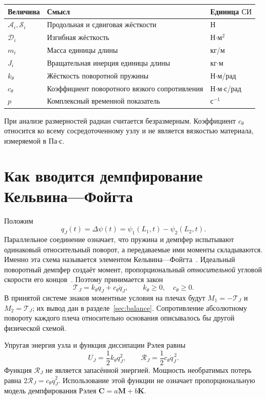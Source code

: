 \documentclass[11pt,a4paper]{article}
\numberwithin{equation}{section}
\newcommand{\A}{\mathcal A}
\newcommand{\D}{\mathcal D}
\newcommand{\Sbeam}{\mathcal S}
\newcommand{\kth}{k_\theta}
\newcommand{\cth}{c_\theta}
\newcommand{\qJ}{q_J}
\newcommand{\TJ}{\mathcal T_J}
\begin{document}
\begin{center}
\begin{tabularx}{\linewidth}{@{}lXl@{}}
\toprule
Величина & Смысл & Единица \(\text{СИ}\)\\
\midrule
$\A_i,\Sbeam_i$ & Продольная и сдвиговая жёсткости & Н\\
$\D_i$ & Изгибная жёсткость & Н$\cdot$м$^2$\\
$m_i$ & Масса единицы длины & кг/м\\
$J_i$ & Вращательная инерция единицы длины & кг$\cdot$м\\
$\kth$ & Жёсткость поворотной пружины & Н$\cdot$м/рад\\
$\cth$ & Коэффициент поворотного вязкого сопротивления & Н$\cdot$м$\cdot$с/рад\\
$p$ & Комплексный временной показатель & с$^{-1}$\\
\bottomrule
\end{tabularx}
\end{center}
При анализе размерностей радиан считается безразмерным. Коэффициент
$\cth$ относится ко всему сосредоточенному узлу и не является вязкостью
материала, измеряемой в Па$\cdot$с.

\section{Как вводится демпфирование Кельвина—Фойгта}
\label{sec:kv}

Положим
\begin{equation}
 \qJ(t)=\Delta\psi(t)=\psi_1(L_1,t)-\psi_2(L_2,t).
 \label{eq:qj}
\end{equation}
Параллельное соединение означает, что пружина и демпфер испытывают
одинаковый относительный поворот, а передаваемые ими моменты складываются.
Именно эта схема называется элементом Кельвина—Фойгта~\cite{comsolkv}.
Идеальный поворотный демпфер создаёт момент, пропорциональный
\emph{относительной} угловой скорости его концов~\cite{mathworksdamper}.
Поэтому принимается закон
\begin{equation}
 \boxed{\TJ=\kth\qJ+\cth\dot\qJ,\qquad \kth\ge0,\quad \cth\ge0.}
 \label{eq:kv}
\end{equation}
В принятой системе знаков моментные условия на плечах будут
$M_1=-\TJ$ и $M_2=\TJ$; их вывод дан в разделе~\ref{sec:balance}.
Сопротивление абсолютному повороту каждого плеча относительно основания
описывалось бы другой физической схемой.

Упругая энергия узла и функция диссипации Рэлея равны
\begin{equation}
 U_J=\frac12\kth\qJ^2,
 \qquad
 \mathcal R_J=\frac12\cth\dot\qJ^{\,2}.
 \label{eq:UR}
\end{equation}
Функция $\mathcal R_J$ не является запасённой энергией. Мощность
необратимых потерь равна $2\mathcal R_J=\cth\dot\qJ^2$.
Использование этой функции не означает пропорциональную модель
демпфирования Рэлея $\mathbf C=a\mathbf M+b\mathbf K$.
\end{document}
